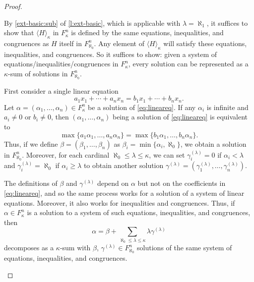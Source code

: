 \documentclass[a4paper,11pt,oneside]{amsart}
\theoremstyle{remark}
\begin{document}
\begin{proof}
  \begin{proofenumerate}
  \item[\ref{ext-diophantine:kappa}]
  By \ref{ext-basic:sub} of \cref{l:ext-basic}, which is applicable with $\lambda = \aleph_1$, it suffices to show that $\langle H \rangle_{\kappa}$ in $F_\kappa^n$ is defined by the same equations, inequalities, and congruences as $H$ itself in $F_{\aleph_0}^n$.
  Any element of $\langle H \rangle_{\kappa}$ will satisfy these equations, inequalities, and congruences.
  So it suffices to show: given a system of equations/inequalities/congruences in $F_\kappa^n$, every solution can be represented as a $\kappa$-sum of solutions in $F_{\aleph_0}^n$.

  First consider a single linear equation
  \begin{equation} \label{eq:lineareq}
    a_1 x_1 + \cdots + a_n x_n = b_1 x_1 + \cdots + b_n x_n.
  \end{equation}
  Let $\alpha=(\alpha_1,\ldots,\alpha_n) \in F_\kappa^n$ be a solution of \cref{eq:lineareq}.
  If any $\alpha_i$ is infinite and $a_i \ne 0$ or $b_i \ne 0$, then $(\alpha_1,\ldots,\alpha_n)$ being a solution of \cref{eq:lineareq} is equivalent to
  \[
    \max\{ a_1 \alpha_1, \ldots, a_n \alpha_n \} = \max\{ b_1 \alpha_1, \ldots, b_n \alpha_n\}.
  \]
  Thus, if we define $\beta=(\beta_1,\ldots,\beta_n)$ as $\beta_i = \min\{\alpha_i,\aleph_0\}$,  we obtain a solution in $F_{\aleph_0}^n$.
  Moreover, for each cardinal $\aleph_0 \le \lambda \le \kappa$, we can set $\gamma_i^{(\lambda)}=0$ if $\alpha_i < \lambda$ and $\gamma_i^{(\lambda)}=\aleph_0$ if $\alpha_i \ge \lambda$ to obtain another solution $\gamma^{(\lambda)}=(\gamma_1^{(\lambda)},\ldots,\gamma_n^{(\lambda)})$.
  
  The definitions of $\beta$ and $\gamma^{(\lambda)}$ depend on $\alpha$ but not on the coefficients in \cref{eq:lineareq}, and so the same process works for a solution of a system of linear equations.
  Moreover, it also works for inequalities and congruences.
  Thus, if $\alpha \in F_\kappa^n$ is a solution to a system of such equations, inequalities, and congruences, then
  \[
    \alpha = \beta + \sum_{\aleph_0 \le \lambda \le \kappa} \lambda \gamma^{(\lambda)}
  \]
  decomposes as a $\kappa$-sum with $\beta$, $\gamma^{(\lambda)} \in F_{\aleph_0}^n$ solutions of the same system of equations, inequalities, and congruences.


\end{proofenumerate}
\end{proof}
\end{document}
